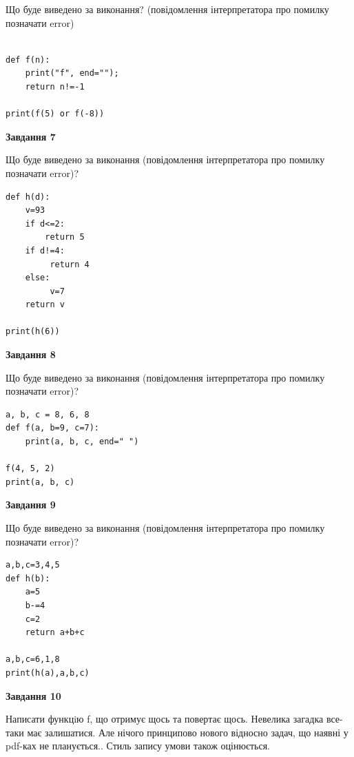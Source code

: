 \documentclass[12pt, ukrainian]{article}
\begin{document}
{\begin {large}
Що буде виведено за виконання? (повідомлення інтерпретатора про помилку позначати error)\par
\begin{verbatim}

def f(n):
    print("f", end="");
    return n!=-1

print(f(5) or f(-8))
\end{verbatim}

{\begin {center}\textbf{Завдання 7}\end {center}}

Що буде виведено за виконання (повідомлення інтерпретатора про помилку позначати error)?\par
\begin{verbatim}
def h(d):
    v=93
    if d<=2: 
        return 5
    if d!=4:
         return 4
    else:
         v=7
    return v

print(h(6))
\end{verbatim}

{\begin {center}\textbf{Завдання 8}\end {center}}

Що буде виведено за виконання (повідомлення інтерпретатора про помилку позначати error)?\par
\begin{verbatim}
a, b, c = 8, 6, 8
def f(a, b=9, c=7):
    print(a, b, c, end=" ")

f(4, 5, 2)
print(a, b, c)
\end{verbatim}

{\begin {center}\textbf{Завдання 9}\end {center}}

Що буде виведено за виконання (повідомлення інтерпретатора про помилку позначати error)?\par
\begin{verbatim}
a,b,c=3,4,5
def h(b):
    a=5
    b-=4
    c=2
    return a+b+c

a,b,c=6,1,8
print(h(a),a,b,c)
\end{verbatim}

{\begin {center}\textbf{Завдання 10}\end {center}}


Написати функцiю f, що отримує щось та повертає щось. Невелика загадка все-таки має залишатися. Але нічого принципово нового відносно задач, що наявні у pdf-ках не планується.. Стиль запису умови також оцінюється.\par
\end {large}}
\newpage
\end{document}
